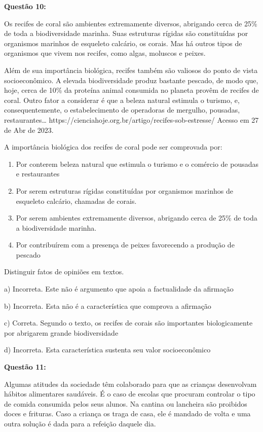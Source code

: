 \textbf{Questão 10:}

Os recifes de coral são ambientes extremamente diversos, abrigando cerca
de 25\% de toda a biodiversidade marinha. Suas estruturas rígidas são
constituídas por organismos marinhos de esqueleto calcário, os corais.
Mas há outros tipos de organismos que vivem nos recifes, como algas,
moluscos e peixes.

Além de sua importância biológica, recifes também são valiosos do ponto
de vista socioeconômico. A elevada biodiversidade produz bastante
pescado, de modo que, hoje, cerca de 10\% da proteína animal consumida
no planeta provêm de recifes de coral. Outro fator a considerar é que a
beleza natural estimula o turismo, e, consequentemente, o
estabelecimento de operadoras de mergulho, pousadas,
restaurantes\ldots{}
https://cienciahoje.org.br/artigo/recifes-sob-estresse/ Acesso em 27 de
Abr de 2023.

A importância biológica dos recifes de coral pode ser comprovada por:

\begin{enumerate}
\def\labelenumi{\alph{enumi})}
\item
  Por conterem beleza natural que estimula o turismo e o comércio de
  pousadas e restaurantes
\item
  Por serem estruturas rígidas constituídas por organismos marinhos de
  esqueleto calcário, chamadas de corais.
\item
  Por serem ambientes extremamente diversos, abrigando cerca de 25\% de
  toda a biodiversidade marinha.
\item
  Por contribuírem com a presença de peixes favorecendo a produção de
  pescado
\end{enumerate}

Distinguir fatos de opiniões em textos.

a) Incorreta. Este não é argumento que apoia a factualidade da afirmação

b) Incorreta. Esta não é a característica que comprova a afirmação

c) Correta. Segundo o texto, os recifes de corais são importantes
biologicamente por abrigarem grande biodiversidade

d) Incorreta. Esta característica sustenta seu valor socioeconômico

\textbf{Questão 11:}

Algumas atitudes da sociedade têm colaborado para que as crianças
desenvolvam hábitos alimentares saudáveis. É o caso de escolas que
procuram controlar o tipo de comida consumida pelos seus alunos. Na
cantina ou lancheira são proibidos doces e frituras. Caso a criança os
traga de casa, ele é mandado de volta e uma outra solução é dada para a
refeição daquele dia.


